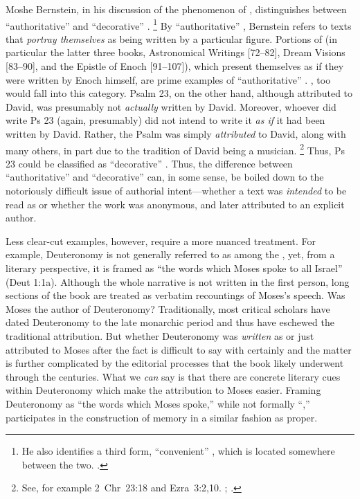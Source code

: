 Moshe Bernstein, in his discussion of the phenomenon of \psy, distinguishes between ``authoritative'' \psy and ``decorative'' \psy.%
    \footnote{He also identifies a third form, ``convenient'' \psy, which is located somewhere between the two. \cite[3--7]{bernstein_chazon-etal1999}.}
By ``authoritative'' \psy, Bernstein refers to texts that \emph{portray themselves} as being written by a particular figure. Portions of \firstenoch (in particular the latter three books, Astronomical Writings [72--82], Dream Visions [83--90], and the Epistle of Enoch [91--107]), which present themselves as if they were written by Enoch himself, are prime examples of ``authoritative'' \psy. \GA, too would fall into this category. Psalm 23, on the other hand, although attributed to David, was presumably not \emph{actually} written by David. Moreover, whoever did write Ps 23 (again, presumably) did not intend to write it \emph{as if} it had been written by David. Rather, the Psalm was simply \emph{attributed} to David, along with many others, in part due to the tradition of David being a musician.%
    \footnote{See, for example 2~Chr~23:18 and Ezra~3:2,10. \cite{mays_interpretation1986}; \cite{sarna_stein-loewe1979}.}
Thus, Ps 23 could be classified as ``decorative'' \psy. Thus, the difference between ``authoritative'' and ``decorative'' \psy can, in some sense, be boiled down to the notoriously difficult issue of authorial intent---whether a text was \emph{intended} to be read as \psa or whether the work was anonymous, and later attributed to an explicit author.

Less clear-cut examples, however, require a more nuanced treatment. For example, Deuteronomy is not generally referred to as among the \psa, yet, from a literary perspective, it is framed as  ``the words which Moses spoke to all Israel'' (Deut 1:1a). Although the whole narrative is not written in the first person, long sections of the book are treated as verbatim recountings of Moses's speech. Was Moses the author of Deuteronomy? Traditionally, most critical scholars have dated Deuteronomy to the late monarchic period and thus have eschewed the traditional attribution. But whether Deuteronomy was \emph{written} as \psa or just attributed to Moses after the fact is difficult to say with certainly and the matter is further complicated by the editorial processes that the book likely underwent through the centuries.%
    \autocite[143--172]{toorn2007}
What we \emph{can} say is that there are concrete literary cues within Deuteronomy which make the attribution to Moses easier. Framing Deuteronomy as ``the words which Moses spoke,'' while not formally ``\psa,'' participates in the construction of memory in a similar fashion as \psa proper.

